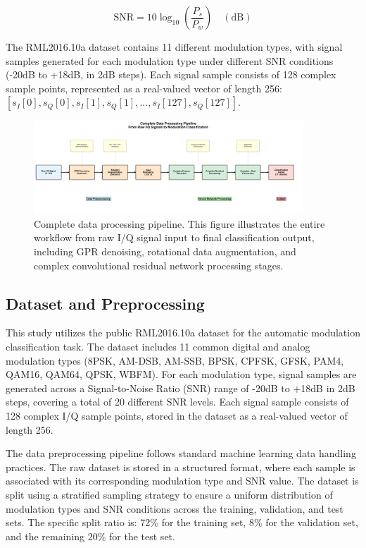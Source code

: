 \documentclass[conference]{IEEEtran}
\begin{document}
\begin{equation}
\mathrm{SNR} = 10\log_{10}\left(\frac{P_s}{P_w}\right) \quad(\mathrm{dB})
\end{equation}

The RML2016.10a dataset contains 11 different modulation types, with signal samples generated for each modulation type under different SNR conditions (-20dB to +18dB, in 2dB steps). Each signal sample consists of 128 complex sample points, represented as a real-valued vector of length 256: $[s_I[0], s_Q[0], s_I[1], s_Q[1], ..., s_I[127], s_Q[127]]$.

\begin{figure}[htbp]
\centering
\includegraphics[width=0.9\textwidth]{figure/data_processing_pipeline.png}
\caption{Complete data processing pipeline. This figure illustrates the entire workflow from raw I/Q signal input to final classification output, including GPR denoising, rotational data augmentation, and complex convolutional residual network processing stages.}
\label{fig:data_pipeline}
\end{figure}

\subsection{Dataset and Preprocessing}

This study utilizes the public RML2016.10a dataset for the automatic modulation classification task. The dataset includes 11 common digital and analog modulation types (8PSK, AM-DSB, AM-SSB, BPSK, CPFSK, GFSK, PAM4, QAM16, QAM64, QPSK, WBFM). For each modulation type, signal samples are generated across a Signal-to-Noise Ratio (SNR) range of -20dB to +18dB in 2dB steps, covering a total of 20 different SNR levels. Each signal sample consists of 128 complex I/Q sample points, stored in the dataset as a real-valued vector of length 256.

The data preprocessing pipeline follows standard machine learning data handling practices. The raw dataset is stored in a structured format, where each sample is associated with its corresponding modulation type and SNR value. The dataset is split using a stratified sampling strategy to ensure a uniform distribution of modulation types and SNR conditions across the training, validation, and test sets. The specific split ratio is: 72\% for the training set, 8\% for the validation set, and the remaining 20\% for the test set.
\end{document}

